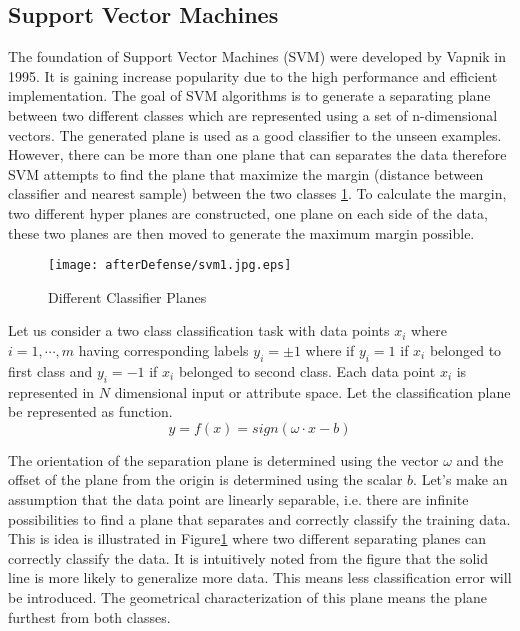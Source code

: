 \subsection{Support Vector Machines}
\label{Sec:SVMdetail}
The foundation of Support Vector Machines (SVM) were developed by Vapnik \cite{svmintroduce} in 1995. It is gaining increase popularity due to the high performance and efficient implementation. The goal of SVM algorithms is to generate a separating plane between two different classes which are represented using a set of n-dimensional vectors. The generated plane is used as a good classifier to the unseen examples. However, there can be more than one plane that can separates the data therefore SVM attempts to find the plane that maximize the margin (distance between classifier and nearest sample) between the two classes \ref{fig:svm1}. To calculate the margin, two different hyper planes are constructed, one plane on each side of the data, these two planes are then moved to generate the maximum margin possible.  
\begin{figure}
	\centering
		\texttt{[image: afterDefense/svm1.jpg.eps]}
	\caption{Different Classifier Planes }
	\label{fig:svm1}
\end{figure}


Let us consider a two class classification task with data points $x_i$ where $i=1,\cdots,m$ having corresponding labels $y_i=\pm1$ where if  $y_i=1$ if $x_i$ belonged to first class and $y_i=-1$ if $x_i$ belonged to second class. Each data point $x_i$ is represented in $N$ dimensional input or attribute space. Let the classification plane be represented as function. 
\begin{equation}
 y=f(x)=sign(\omega \cdot x - b)
\label{eq:planeEq}
\end{equation}

 The orientation of the separation plane is determined using the vector $\omega$ and the offset of the plane from the origin is determined using the scalar $b$.   Let's make an assumption that the data point are linearly separable, i.e. there are infinite possibilities to find a plane that separates and correctly classify the training data. This is idea is illustrated in Figure\ref{fig:svm1} where two different separating planes can correctly classify the data. It is intuitively noted from the figure that the solid line is more likely to generalize more data. This means less classification error will be introduced. The geometrical characterization of this plane means the plane furthest from both classes.     %
 
